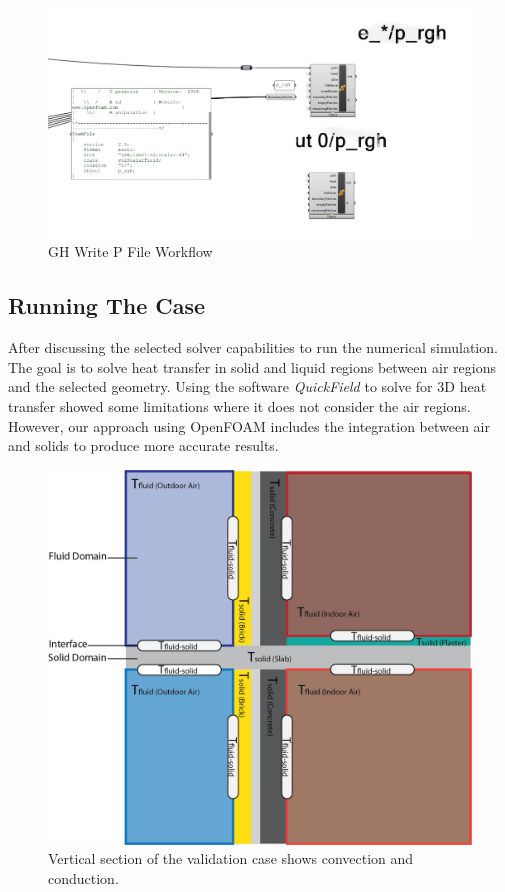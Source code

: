 \begin{figure}[tbh]
\centering
\includegraphics[width=0.77\columnwidth]{Figures/writepgh.png}
\hspace{0.7cm}
\caption{GH Write P File Workflow}
\label{Pgh}
\end{figure}


















\subsection{Running The Case}    
 
After discussing the selected solver capabilities to run the numerical simulation. The goal is to solve heat transfer in solid and liquid regions between air regions and the selected geometry. Using the software \textit{QuickField}  to solve for 3D heat transfer showed some limitations where it does not consider the air regions. However, our approach using OpenFOAM includes the integration between air and solids to produce more accurate results. 

\begin{figure}[tbh] 
\includegraphics[width=0.77\columnwidth]{Figures/conductive.png}
\hspace{0.7cm}
\caption[3D Interfaces]{Vertical section of the validation case shows convection and conduction.}
\label{interface}
\end{figure}

